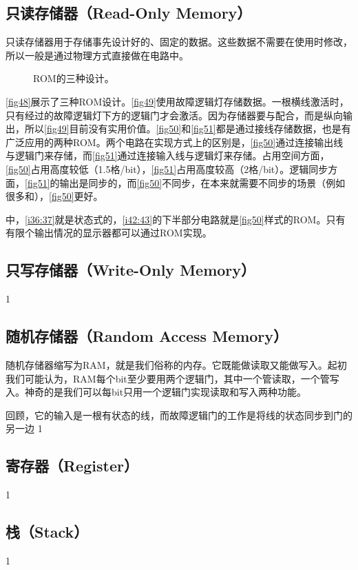 \subsection{只读存储器（Read-Only Memory）}
只读存储器用于存储事先设计好的、固定的数据。这些数据不需要在使用时修改，所以一般是通过物理方式直接做在电路中。
\begin{figure}[!ht]
    \centering
	
    \caption{ROM的三种设计。}\label{fig48}
\end{figure}
\autoref{fig48}展示了三种ROM设计。\autoref{fig49}使用故障逻辑灯存储数据。一根横线激活时，只有经过的故障逻辑灯下方的逻辑门才会激活。因为存储器要与\termMUX 配合，而\termMUX 是纵向输出，所以\autoref{fig49}目前没有实用价值。\autoref{fig50}和\autoref{fig51}都是通过接线存储数据，也是有广泛应用的两种ROM。两个电路在实现方式上的区别是，\autoref{fig50}通过连接输出线与逻辑门来存储，而\autoref{fig51}通过连接输入线与逻辑灯来存储。占用空间方面，\autoref{fig50}占用高度较低（1.5格/bit），\autoref{fig51}占用高度较高（2格/bit）。逻辑同步方面，\autoref{fig51}的输出是同步的，而\autoref{fig50}不同步，在本来就需要不同步的场景（例如很多和），\autoref{fig50}更好。

中，\autoref{i36:37}就是状态式的\termMUX ，\autoref{i42:43}的下半部分电路就是\autoref{fig50}样式的ROM。只有有限个输出情况的显示器都可以通过ROM实现。

\subsection{只写存储器（Write-Only Memory）}
1
\subsection{随机存储器（Random Access Memory）}

随机存储器缩写为RAM，就是我们俗称的内存。它既能做读取又能做写入。起初我们可能认为，RAM每个bit至少要用两个逻辑门，其中一个管读取，一个管写入。神奇的是我们可以每bit只用一个逻辑门实现读取和写入两种功能。

回顾，它的输入是一根有状态的线，而故障逻辑门的工作是将线的状态同步到门的另一边
1
\subsection{寄存器（Register）}
1
\subsection{栈（Stack）}
1